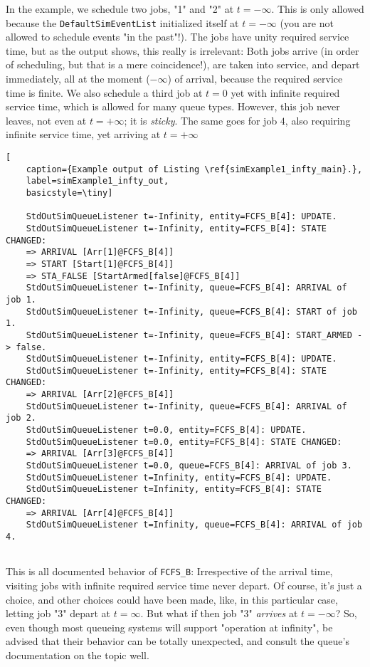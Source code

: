 In the example, we schedule two jobs, "1" and "2" at $t=-\infty$.
This is only allowed because the \lstinline|DefaultSimEventList|
initialized itself at $t=-\infty$
(you are not allowed to schedule events "in the past"!).
The jobs have unity required service time,
but as the output shows, this really is irrelevant:
Both jobs arrive (in order of scheduling, but that is a mere coincidence!),
are taken into service, and depart immediately,
all at the moment ($-\infty$) of arrival,
because the required service time is finite.
We also schedule a third job at $t=0$ yet with infinite
required service time,
which is allowed for many queue types.
However, this job never leaves, not even at $t=+\infty$;
it is {\em sticky\/}.
The same goes for job $4$,
also requiring infinite service time,
yet arriving at $t=+\infty$

\begin{lstfloat}
	\begin{lstlisting}[
	caption={Example output of Listing \ref{simExample1_infty_main}.},
	label=simExample1_infty_out,
	basicstyle=\tiny]
	
	StdOutSimQueueListener t=-Infinity, entity=FCFS_B[4]: UPDATE.
	StdOutSimQueueListener t=-Infinity, entity=FCFS_B[4]: STATE CHANGED:
	=> ARRIVAL [Arr[1]@FCFS_B[4]]
	=> START [Start[1]@FCFS_B[4]]
	=> STA_FALSE [StartArmed[false]@FCFS_B[4]]
	StdOutSimQueueListener t=-Infinity, queue=FCFS_B[4]: ARRIVAL of job 1.
	StdOutSimQueueListener t=-Infinity, queue=FCFS_B[4]: START of job 1.
	StdOutSimQueueListener t=-Infinity, queue=FCFS_B[4]: START_ARMED -> false.
	StdOutSimQueueListener t=-Infinity, entity=FCFS_B[4]: UPDATE.
	StdOutSimQueueListener t=-Infinity, entity=FCFS_B[4]: STATE CHANGED:
	=> ARRIVAL [Arr[2]@FCFS_B[4]]
	StdOutSimQueueListener t=-Infinity, queue=FCFS_B[4]: ARRIVAL of job 2.
	StdOutSimQueueListener t=0.0, entity=FCFS_B[4]: UPDATE.
	StdOutSimQueueListener t=0.0, entity=FCFS_B[4]: STATE CHANGED:
	=> ARRIVAL [Arr[3]@FCFS_B[4]]
	StdOutSimQueueListener t=0.0, queue=FCFS_B[4]: ARRIVAL of job 3.
	StdOutSimQueueListener t=Infinity, entity=FCFS_B[4]: UPDATE.
	StdOutSimQueueListener t=Infinity, entity=FCFS_B[4]: STATE CHANGED:
	=> ARRIVAL [Arr[4]@FCFS_B[4]]
	StdOutSimQueueListener t=Infinity, queue=FCFS_B[4]: ARRIVAL of job 4.
	
	\end{lstlisting}
\end{lstfloat}

This is all documented behavior of \lstinline|FCFS_B|:
Irrespective of the arrival time,
visiting jobs with infinite required service time
never depart.
Of course, it's just a choice, and other choices could have been made,
like, in this particular case,
letting job "3" depart at $t=\infty$.
But what if then job "3" {\em arrives\/} at $t=-\infty$?
So, even though most queueing systems
will support "operation at infinity",
be advised that their behavior
can be totally unexpected,
and consult the queue's documentation on the topic well.

